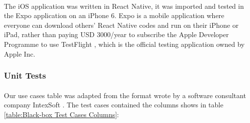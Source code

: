 \documentclass[12pt,a4paper]{article}
\begin{document}
          \paragraph{} The iOS application was written in React Native, it was imported and tested in the Expo \cite{Expo} application on an iPhone 6. Expo is a mobile application where everyone can download others' React Native codes and run on their iPhone or iPad, rather than paying USD 3000/year to subscribe the Apple Developer Programme to use TestFlight \cite{TestFlight}, which is the official testing application owned by Apple Inc. 
        
        \subsubsection{Unit Tests} %
          \paragraph{}Our use cases table was adapted from the format wrote by a software consultant company IntexSoft \cite{UseCaseTestingReference}. The test cases contained the columns shows in table \ref{table:Black-box Test Cases Columns}: 
\end{document}
